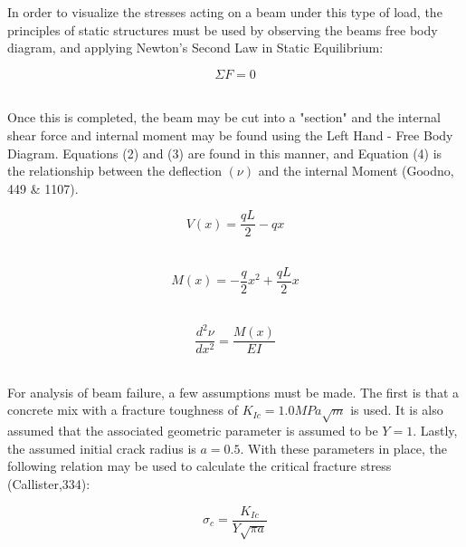 \documentclass[landscape,a0paper,fontscale=0.335]{baposter} %
\begin{document}
\begin{poster}
{In order to visualize the stresses acting on a beam under this type of load, the principles of static structures must be used by observing the beams free body diagram, and applying Newton's Second Law in Static Equilibrium:

\begin{equation}
\Sigma F = 0
\label{eq: SumForces}
\end{equation}\

Once this is completed, the beam may be cut into a "section" and the internal shear force and internal moment may be found using the Left Hand - Free Body Diagram. Equations (2) and (3) are found in this manner, and Equation (4) is the relationship between the deflection $\left(\nu\right)$ and the internal Moment (Goodno, 449 \& 1107).

\begin{multicols}{3}
\begin{equation}
V(x) = \frac{qL}{2} - qx
\label{eq: Shears}
\end{equation}\


\begin{equation}
M(x) = - \frac{q}{2}x^2 + \frac{qL}{2}x 
\label{eq: Moments}
\end{equation}\


\begin{equation}
\frac{d^2\nu}{dx^2} = \frac{M(x)}{EI}
\label{eq: Deflection}
\end{equation}\

\end{multicols}

For analysis of beam failure, a few assumptions must be made. The first is that a concrete mix with a fracture toughness of $K_{Ic} = 1.0 MPa\sqrt{m}$ is used. It is also assumed that the associated geometric parameter is assumed to be $Y=1$. Lastly, the assumed initial crack radius is $a = 0.5$. With these parameters in place, the following relation may be used to calculate the critical fracture stress (Callister,334):

\begin{equation}
\sigma_c = \frac{K_{Ic}}{Y\sqrt{\pi a}}
\label{eq: CrackStress}
\end{equation}\


}



\end{poster}
\end{document}
